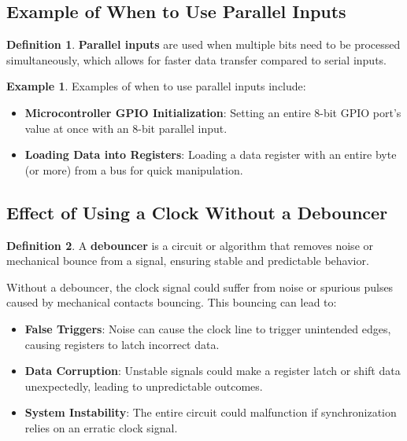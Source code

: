 \documentclass[12pt]{article}
\theoremstyle{definition}
\newtheorem{definition}{Definition}
\newtheorem{example}{Example}
\begin{document}
\subsection{Example of When to Use Parallel Inputs}

\begin{definition}
	\textbf{Parallel inputs} are used when multiple bits need to be processed simultaneously, which allows for faster data transfer compared to serial inputs.
\end{definition}

\begin{example}
	Examples of when to use parallel inputs include:
	\begin{itemize}
		\item \textbf{Microcontroller GPIO Initialization}: Setting an entire 8-bit GPIO port’s value at once with an 8-bit parallel input.
		\item \textbf{Loading Data into Registers}: Loading a data register with an entire byte (or more) from a bus for quick manipulation.
	\end{itemize}
\end{example}

\subsection{Effect of Using a Clock Without a Debouncer}

\begin{definition}
	A \textbf{debouncer} is a circuit or algorithm that removes noise or mechanical bounce from a signal, ensuring stable and predictable behavior.
\end{definition}

Without a debouncer, the clock signal could suffer from noise or spurious pulses caused by mechanical contacts bouncing. This bouncing can lead to:
\begin{itemize}
	\item \textbf{False Triggers}: Noise can cause the clock line to trigger unintended edges, causing registers to latch incorrect data.
	\item \textbf{Data Corruption}: Unstable signals could make a register latch or shift data unexpectedly, leading to unpredictable outcomes.
	\item \textbf{System Instability}: The entire circuit could malfunction if synchronization relies on an erratic clock signal.
\end{itemize}
\end{document}
